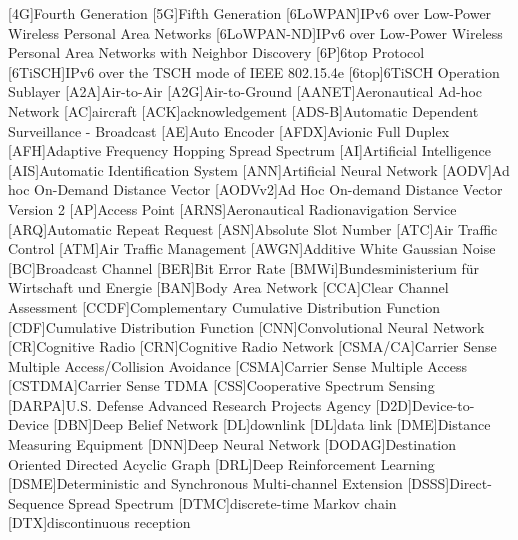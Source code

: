\begin{acronym}

[4G]{Fourth Generation}
[5G]{Fifth Generation}
[6LoWPAN]{IPv6 over Low-Power Wireless Personal Area Networks}
[6LoWPAN-ND]{IPv6 over Low-Power Wireless Personal Area Networks with Neighbor Discovery}
[6P]{6top Protocol}
[6TiSCH]{IPv6 over the TSCH mode of IEEE 802.15.4e}
[6top]{6TiSCH Operation Sublayer}
[A2A]{Air-to-Air}
[A2G]{Air-to-Ground}
[AANET]{Aeronautical Ad-hoc Network}
[AC]{aircraft}
[ACK]{acknowledgement}
[ADS-B]{Automatic Dependent Surveillance - Broadcast}
[AE]{Auto Encoder}
[AFDX]{Avionic Full Duplex}
[AFH]{Adaptive Frequency Hopping Spread Spectrum}
[AI]{Artificial Intelligence}
[AIS]{Automatic Identification System}
[ANN]{Artificial Neural Network}
[AODV]{Ad hoc On-Demand Distance Vector}
[AODVv2]{Ad Hoc On-demand Distance Vector Version 2}
[AP]{Access Point}
[ARNS]{Aeronautical Radionavigation Service}
[ARQ]{Automatic Repeat Request}
[ASN]{Absolute Slot Number}
[ATC]{Air Traffic Control}
[ATM]{Air Traffic Management}
[AWGN]{Additive White Gaussian Noise}
[BC]{Broadcast Channel}
[BER]{Bit Error Rate}
[BMWi]{Bundesministerium für Wirtschaft und Energie}
[BAN]{Body Area Network}
[CCA]{Clear Channel Assessment}
[CCDF]{Complementary Cumulative Distribution Function}
[CDF]{Cumulative Distribution Function}
[CNN]{Convolutional Neural Network}
[CR]{Cognitive Radio}
[CRN]{Cognitive Radio Network}
[CSMA/CA]{Carrier Sense Multiple Access/Collision Avoidance}
[CSMA]{Carrier Sense Multiple Access}
[CSTDMA]{Carrier Sense TDMA}
[CSS]{Cooperative Spectrum Sensing}
[DARPA]{U.S. Defense Advanced Research Projects Agency}
[D2D]{Device-to-Device}
[DBN]{Deep Belief Network}
[DL]{downlink}
[DL]{data link}
[DME]{Distance Measuring Equipment}
[DNN]{Deep Neural Network}
[DODAG]{Destination Oriented Directed Acyclic Graph}
[DRL]{Deep Reinforcement Learning}
[DSME]{Deterministic and Synchronous Multi-channel Extension}
[DSSS]{Direct-Sequence Spread Spectrum}
[DTMC]{discrete-time Markov chain}
[DTX]{discontinuous reception}

\end{acronym}
